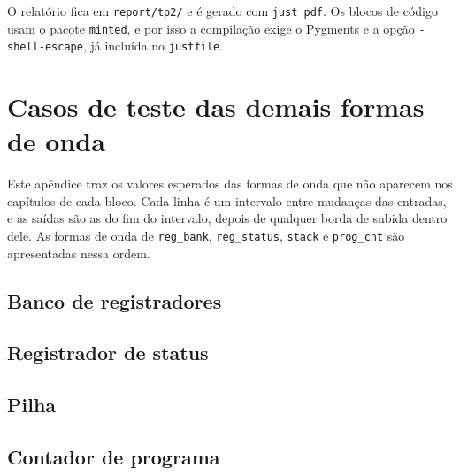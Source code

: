 O relatório fica em \texttt{report/tp2/} e é gerado com \texttt{just pdf}. Os blocos de código usam o pacote \texttt{minted}, e por isso a compilação exige o Pygments e a opção \texttt{-shell-escape}, já incluída no \texttt{justfile}.

\chapter{Casos de teste das demais formas de onda}
\label{ap:tabelas}

Este apêndice traz os valores esperados das formas de onda que não aparecem nos capítulos de cada bloco. Cada linha é um intervalo entre mudanças das entradas, e as saídas são as do fim do intervalo, depois de qualquer borda de subida dentro dele. As formas de onda de \texttt{reg\_bank}, \texttt{reg\_status}, \texttt{stack} e \texttt{prog\_cnt} são apresentadas nessa ordem.

\section{Banco de registradores}





\section{Registrador de status}





\section{Pilha}





\section{Contador de programa}



